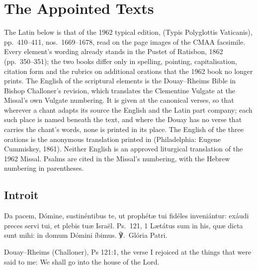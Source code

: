 \section{The Appointed Texts}
\label{sec:appointed-texts}

The Latin below is that of the 1962 typical edition, 
(Typis Polyglottis Vaticanis), pp.~410--411, nos.~1669--1678, read on the page
images of the CMAA facsimile. Every element's wording already stands in the
Pustet  of Ratisbon, 1862 (pp.~350--351); the two books
differ only in spelling, pointing, capitalisation, citation form and the
rubrics on additional orations that the 1962 book no longer prints. The
English of the scriptural elements is the Douay--Rheims Bible in Bishop
Challoner's revision, which translates the Clementine Vulgate at the Missal's
own Vulgate numbering. It is given at the canonical verses, so that wherever a
chant adapts its source the English and the Latin part company; each such place
is named beneath the text, and where the Douay has no verse that carries the
chant's words, none is printed in its place. The English of the three orations
is the anonymous translation printed in  (Philadelphia: Eugene Cummiskey,
1861). Neither English is an approved liturgical translation of the 1962
Missal. Psalms are cited in the Missal's numbering, with the Hebrew numbering
in parentheses.

\subsection{Introit}
\label{proper-introit}


\begin{latinproper}
Da pacem, Dómine, sustinéntibus te, ut prophétæ tui fidéles inveniántur:
exáudi preces servi tui, et plebis tuæ Israël. \textnormal{Ps.\ 121, 1}
Lætátus sum in his, quæ dicta sunt mihi: in domum Dómini íbimus.
℣.~Glória Patri.
\end{latinproper}

\begin{englishwitness}{Douay--Rheims (Challoner), Ps 121:1, the verse}
I rejoiced at the things that were said to me: We shall go into the house of
the Lord.
\end{englishwitness}

